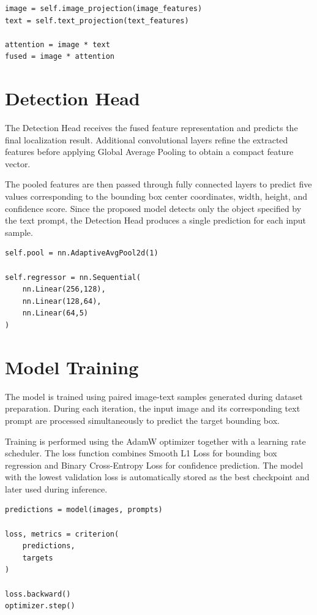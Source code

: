 \documentclass[a4paper,12pt]{report}
\begin{document}
\begin{lstlisting}[caption={Cross-Attention Fusion}, label={lst:tgod-cross-attention-fusion}]
image = self.image_projection(image_features)
text = self.text_projection(text_features)

attention = image * text
fused = image * attention
\end{lstlisting}

\section{Detection Head}
\label{sec:tgod-detection-head}

The Detection Head receives the fused feature representation and predicts
the final localization result. Additional convolutional layers refine the
extracted features before applying Global Average Pooling to obtain a
compact feature vector.

The pooled features are then passed through fully connected layers to
predict five values corresponding to the bounding box center coordinates,
width, height, and confidence score. Since the proposed model detects only
the object specified by the text prompt, the Detection Head produces a
single prediction for each input sample.

\begin{lstlisting}[caption={Detection Head}, label={lst:tgod-detection-head}]
self.pool = nn.AdaptiveAvgPool2d(1)

self.regressor = nn.Sequential(
    nn.Linear(256,128),
    nn.Linear(128,64),
    nn.Linear(64,5)
)
\end{lstlisting}

\section{Model Training}
\label{sec:tgod-model-training}

The model is trained using paired image-text samples generated during
dataset preparation. During each iteration, the input image and its
corresponding text prompt are processed simultaneously to predict the
target bounding box.

Training is performed using the AdamW optimizer together with a learning
rate scheduler. The loss function combines Smooth L1 Loss for bounding box
regression and Binary Cross-Entropy Loss for confidence prediction. The
model with the lowest validation loss is automatically stored as the best
checkpoint and later used during inference.

\begin{lstlisting}[caption={Training step}, label={lst:tgod-training-step}]
predictions = model(images, prompts)

loss, metrics = criterion(
    predictions,
    targets
)

loss.backward()
optimizer.step()
\end{lstlisting}
\end{document}

